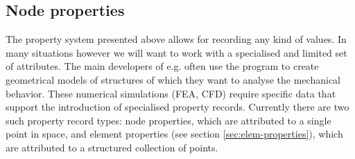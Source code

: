 \subsection{Node properties}
\label{sec:node-properties}

The property system presented above allows for recording any kind of values. In many situations however we will want to work with a specialised and limited set of attributes. The main developers of \pyf e.g. often use the program to create geometrical models of structures of which they want to analyse the mechanical behavior. These numerical simulations (FEA, CFD) require specific data that support the introduction of specialised property records. Currently there are two such property record types: node properties, which are attributed to a single point in space, and element properties (see section \ref{sec:elem-properties}), which are attributed to a structured collection of points.


